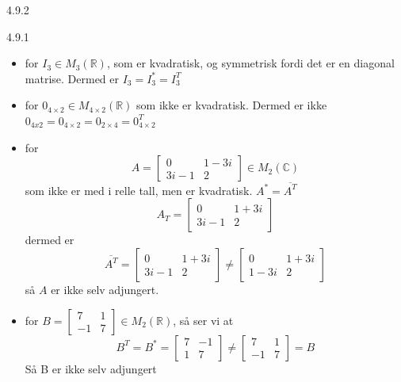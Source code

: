 \documentclass[a4paper,norsk]{article}
\begin{document}
\begin{oppgavebox}{4.9.2}{}
\begin{proofbox}{4.9.1}{}
\begin{itemize}
    \item for $ I_3 \in M_3(\mathbb{R}) $, som er kvadratisk, og symmetrisk fordi det er en diagonal matrise. Dermed er $ I_3 = I_3^* = I_3^T $  
    \item for $ 0_{4\times 2} \in M_{4 \times 2}(\mathbb{R}) $ som ikke er kvadratisk. Dermed er ikke $ 0_{4x2} = 0_{4 \times 2} = 0_{2 \times 4} = 0_{4 \times 2}^T $  
    \item for 
    \[
        A = \begin{bmatrix}
            0& 1-3i \\
            3i-1 & 2
        \end{bmatrix}  \in M_2(\mathbb{C})
    \]
    som ikke er med i relle tall, men er kvadratisk. $ A^* = \overline{A^T} $ 
    \[
        A_T = \begin{bmatrix}
            0& 1+3i\\
            3i-1&2
        \end{bmatrix} 
    \]
    dermed er \[
        \overline{A^T} = \begin{bmatrix}
            0&1+3i\\
            3i-1&2
        \end{bmatrix} \neq \begin{bmatrix}
            0&1+3i\\
            1-3i&2
        \end{bmatrix} 
    \]
    så $ A $ er ikke selv adjungert.
    \item for $ B = \begin{bmatrix}
        7&1\\
        -1&7
    \end{bmatrix} \in M_2(\mathbb{R}) $, så ser vi at 
    \[
        B^T = B^* = \begin{bmatrix}
            7&-1\\
            1&7
        \end{bmatrix} \neq \begin{bmatrix}
            7&1\\
            -1&7
        \end{bmatrix} =B
    \]
    Så B er ikke selv adjungert
\end{itemize}
\end{proofbox}


\end{oppgavebox}
\end{document}
